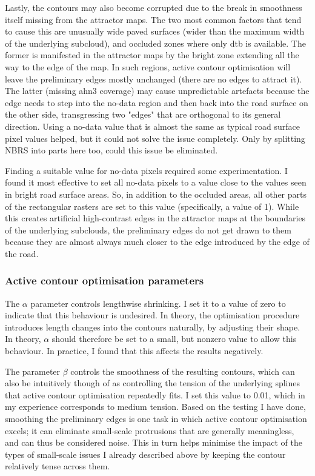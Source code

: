 Lastly, the contours may also become corrupted due to the break in smoothness itself missing from the attractor maps. The two most common factors that tend to cause this are unusually wide paved surfaces (wider than the maximum width of the underlying subcloud), and occluded zones where only \ac{dtb} is available. The former is manifested in the attractor maps by the bright zone extending all the way to the edge of the map. In such regions, active contour optimisation will leave the preliminary edges mostly unchanged (there are no edges to attract it). The latter (missing \ac{ahn3} coverage) may cause unpredictable artefacts because the edge needs to step into the no-data region and then back into the road surface on the other side, transgressing two "edges" that are orthogonal to its general direction. Using a no-data value that is almost the same as typical road surface pixel values helped, but it could not solve the issue completely. Only by splitting NBRS into parts here too, could this issue be eliminated.

Finding a suitable value for no-data pixels required some experimentation. I found it most effective to set all no-data pixels to a value close to the values seen in bright road surface areas. So, in addition to the occluded areas, all other parts of the rectangular rasters are set to this value (specifically, a value of 1). While this creates artificial high-contrast edges in the attractor maps at the boundaries of the underlying subclouds, the preliminary edges do not get drawn to them because they are almost always much closer to the edge introduced by the edge of the road.

\subsubsection{Active contour optimisation parameters}

The $\alpha$ parameter controls lengthwise shrinking. I set it to a value of zero to indicate that this behaviour is undesired. In theory, the optimisation procedure introduces length changes into the contours naturally, by adjusting their shape. In theory, $\alpha$ should therefore be set to a small, but nonzero value to allow this behaviour. In practice, I found that this affects the results negatively.

The parameter $\beta$ controls the smoothness of the resulting contours, which can also be intuitively though of as controlling the tension of the underlying splines that active contour optimisation repeatedly fits. I set this value to 0.01, which in my experience corresponds to medium tension. Based on the testing I have done, smoothing the preliminary edges is one task in which active contour optimisation excels; it can eliminate small-scale protrusions that are generally meaningless, and can thus be considered noise. This in turn helps minimise the impact of the types of small-scale issues I already described above by keeping the contour relatively tense across them. 

